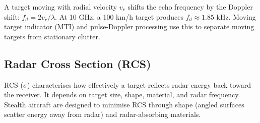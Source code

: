 A target moving with radial velocity $v_r$ shifts the echo frequency by the Doppler shift: $f_d = 2v_r/\lambda$. At 10 GHz, a 100 km/h target produces $f_d \approx 1.85$ kHz. Moving target indicator (MTI) and pulse-Doppler processing use this to separate moving targets from stationary clutter.

				

\subsection{Radar Cross Section (RCS)}

				

RCS ($\sigma$) characterises how effectively a target reflects radar energy back toward the receiver. It depends on target size, shape, material, and radar frequency. Stealth aircraft are designed to minimise RCS through shape (angled surfaces scatter energy away from radar) and radar-absorbing materials.



